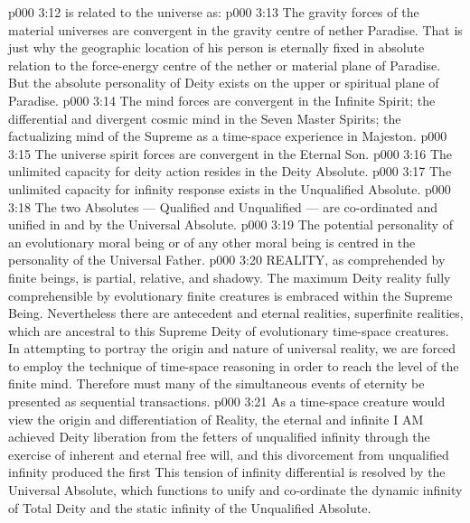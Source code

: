\vs p000 3:12 \pc {} is related to the universe as:
\vs p000 3:13 \bibnobreakspace The gravity forces of the material universes are convergent in the gravity centre of nether Paradise. That is just why the geographic location of his person is eternally fixed in absolute relation to the force\hyp{}energy centre of the nether or material plane of Paradise. But the absolute personality of Deity exists on the upper or spiritual plane of Paradise.
\vs p000 3:14 \bibnobreakspace The mind forces are convergent in the Infinite Spirit; the differential and divergent cosmic mind in the Seven Master Spirits; the factualizing mind of the Supreme as a time\hyp{}space experience in Majeston.
\vs p000 3:15 \bibnobreakspace The universe spirit forces are convergent in the Eternal Son.
\vs p000 3:16 \bibnobreakspace The unlimited capacity for deity action resides in the Deity Absolute.
\vs p000 3:17 \bibnobreakspace The unlimited capacity for infinity response exists in the Unqualified Absolute.
\vs p000 3:18 \bibnobreakspace The two Absolutes --- Qualified and Unqualified --- are co\hyp{}ordinated and unified in and by the Universal Absolute.
\vs p000 3:19 \bibnobreakspace The potential personality of an evolutionary moral being or of any other moral being is centred in the personality of the Universal Father.
\vs p000 3:20 \pc REALITY, as comprehended by finite beings, is partial, relative, and shadowy. The maximum Deity reality fully comprehensible by evolutionary finite creatures is embraced within the Supreme Being. Nevertheless there are antecedent and eternal realities, superfinite realities, which are ancestral to this Supreme Deity of evolutionary time\hyp{}space creatures. In attempting to portray the origin and nature of universal reality, we are forced to employ the technique of time\hyp{}space reasoning in order to reach the level of the finite mind. Therefore must many of the simultaneous events of eternity be presented as sequential transactions.
\vs p000 3:21 As a time\hyp{}space creature would view the origin and differentiation of Reality, the eternal and infinite I AM achieved Deity liberation from the fetters of unqualified infinity through the exercise of inherent and eternal free will, and this divorcement from unqualified infinity produced the first  This tension of infinity differential is resolved by the Universal Absolute, which functions to unify and co\hyp{}ordinate the dynamic infinity of Total Deity and the static infinity of the Unqualified Absolute.
